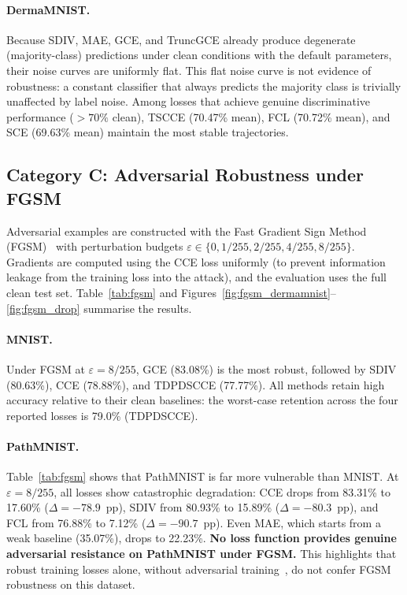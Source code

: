 \paragraph{DermaMNIST.}
Because SDIV, MAE, GCE, and TruncGCE already produce degenerate
(majority-class) predictions under clean conditions with the default
parameters, their noise curves are uniformly flat.
This flat noise curve is not evidence of robustness: a constant classifier
that always predicts the majority class is trivially unaffected by label
noise.
Among losses that achieve genuine discriminative performance ($>70\%$ clean),
TSCCE (70.47\% mean), FCL (70.72\% mean), and SCE (69.63\% mean) maintain
the most stable trajectories.

\subsection{Category C: Adversarial Robustness under FGSM}
\label{sec:fgsm}

Adversarial examples are constructed with the Fast Gradient Sign Method
(FGSM)~\citep{goodfellow2015} with perturbation budgets
$\varepsilon \in \{0, 1/255, 2/255, 4/255, 8/255\}$.
Gradients are computed using the CCE loss uniformly (to prevent information
leakage from the training loss into the attack),
and the evaluation uses the full clean test set.
Table~\ref{tab:fgsm} and Figures~\ref{fig:fgsm_dermamnist}--\ref{fig:fgsm_drop}
summarise the results.

\paragraph{MNIST.}
Under FGSM at $\varepsilon{=}8/255$, GCE (83.08\%) is the most robust,
followed by SDIV (80.63\%), CCE (78.88\%), and TDPDSCCE (77.77\%).
All methods retain high accuracy relative to their clean baselines:
the worst-case retention across the four reported losses is 79.0\% (TDPDSCCE).

\paragraph{PathMNIST.}
Table~\ref{tab:fgsm} shows that PathMNIST is far more vulnerable than MNIST.
At $\varepsilon{=}8/255$, all losses show catastrophic degradation:
CCE drops from 83.31\% to 17.60\% ($\Delta{=}{-78.9}$~pp),
SDIV from 80.93\% to 15.89\% ($\Delta{=}{-80.3}$~pp), and
FCL from 76.88\% to 7.12\% ($\Delta{=}{-90.7}$~pp).
Even MAE, which starts from a weak baseline (35.07\%), drops to 22.23\%.
\textbf{No loss function provides genuine adversarial resistance on PathMNIST
under FGSM.}
This highlights that robust training losses alone, without adversarial
training~\citep{madry2018}, do not confer FGSM robustness on this dataset.

